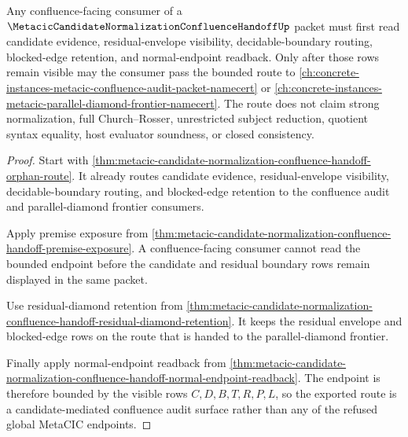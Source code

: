 \begin{theorem}
\label{thm:metacic-candidate-normalization-confluence-route}
Any confluence-facing consumer of a $\MetacicCandidateNormalizationConfluenceHandoffUp$ packet must first read candidate evidence, residual-envelope visibility, decidable-boundary routing, blocked-edge retention, and normal-endpoint readback. Only after those rows remain visible may the consumer pass the bounded route to \autoref{ch:concrete-instances-metacic-confluence-audit-packet-namecert} or \autoref{ch:concrete-instances-metacic-parallel-diamond-frontier-namecert}. The route does not claim strong normalization, full Church--Rosser, unrestricted subject reduction, quotient syntax equality, host evaluator soundness, or closed consistency.
\end{theorem}
\begin{proof}
Start with \autoref{thm:metacic-candidate-normalization-confluence-handoff-orphan-route}. It already routes candidate evidence, residual-envelope visibility, decidable-boundary routing, and blocked-edge retention to the confluence audit and parallel-diamond frontier consumers.

Apply premise exposure from \autoref{thm:metacic-candidate-normalization-confluence-handoff-premise-exposure}. A confluence-facing consumer cannot read the bounded endpoint before the candidate and residual boundary rows remain displayed in the same packet.

Use residual-diamond retention from \autoref{thm:metacic-candidate-normalization-confluence-handoff-residual-diamond-retention}. It keeps the residual envelope and blocked-edge rows on the route that is handed to the parallel-diamond frontier.

Finally apply normal-endpoint readback from \autoref{thm:metacic-candidate-normalization-confluence-handoff-normal-endpoint-readback}. The endpoint is therefore bounded by the visible rows $C,D,B,T,R,P,L$, so the exported route is a candidate-mediated confluence audit surface rather than any of the refused global MetaCIC endpoints.
\end{proof}


